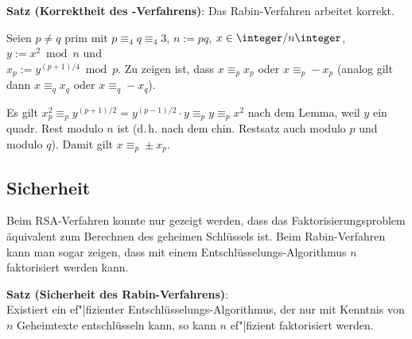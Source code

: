 \linie

\textbf{Satz (Korrektheit des -Verfahrens)}:
Das Rabin-Verfahren arbeitet korrekt.

\begin{Beweis}
    Seien $p \not= q$ prim mit $p \equiv_4 q \equiv_4 3$,
    $n := pq$,
    $x \in \ZnZ$,
    $y := x^2 \bmod n$ und\\
    $x_p := y^{(p+1)/4} \bmod p$.
    Zu zeigen ist, dass $x \equiv_p x_p$ oder $x \equiv_p -x_p$
    (analog gilt dann $x \equiv_q x_q$ oder $x \equiv_q -x_q$).

    Es gilt $x_p^2 \equiv_p y^{(p+1)/2} = y^{(p-1)/2} \cdot y \equiv_p y \equiv_p x^2$
    nach dem Lemma, weil $y$ ein quadr. Rest modulo $n$ ist
    (d.\,h. nach dem chin. Restsatz auch modulo $p$ und modulo $q$).
    Damit gilt $x \equiv_p \pm x_p$.
\end{Beweis}

\subsection{%
    Sicherheit%
}

Beim RSA-Verfahren konnte nur gezeigt werden, dass das Faktorisierungsproblem äquivalent zum
Berechnen des geheimen Schlüssels ist.
Beim Rabin-Verfahren kann man sogar zeigen, dass mit einem Entschlüsselungs-Algorithmus
$n$ faktorisiert werden kann.

\textbf{Satz (Sicherheit des Rabin-Verfahrens)}:\\
Existiert ein ef"|fizienter Entschlüsselungs-Algorithmus, der nur mit Kenntnis von $n$
Geheimtexte entschlüsseln kann, so kann $n$ ef"|fizient faktorisiert werden.

